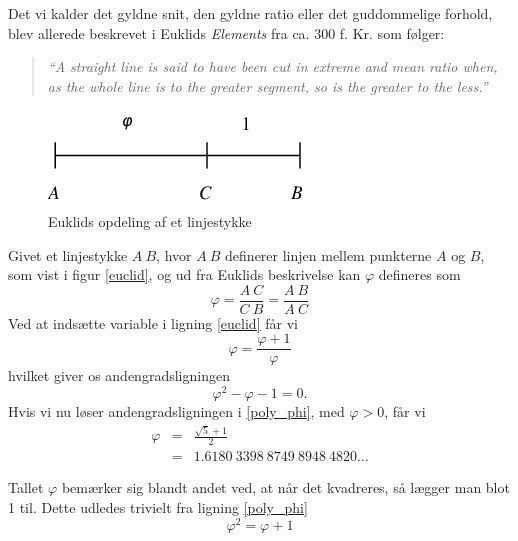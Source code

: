 {
Det vi kalder det gyldne snit, den gyldne ratio eller det guddommelige
forhold, blev allerede beskrevet i Euklids \emph{Elements} fra ca. 300
f.  Kr. som følger:
\begin{quote}
	\emph{``A straight line is said to have been cut in extreme
	and mean ratio when, as the whole line is to the greater
	segment, so is the greater to the less.''}\cite{Euclid300bc}
\end{quote}

\begin{figure}[h!]
	\begin{center}
		\includegraphics[scale=0.49,angle=0]{afsnit/baggrund/billeder/line_segment_a_c_b}
	\end{center}
	\caption{Euklids opdeling af et linjestykke}
	\label{line_segment}
\end{figure}

Givet et linjestykke $A\ B$, hvor $A\ B$ definerer linjen mellem
punkterne $A$ og $B$, som vist i figur \ref{euclid}, og ud fra Euklids
beskrivelse kan $\varphi$ defineres som
\begin{equation}
	\varphi	= \frac{A\ C}{C\ B} = \frac{A\ B}{A\ C}
	\label{euclid}
\end{equation}
Ved at indsætte variable i ligning \ref{euclid} får vi
\begin{equation}
	\varphi = \frac{\varphi + 1}{\varphi}
	\label{expand_euclid}
\end{equation}
hvilket giver os andengradsligningen
\begin{equation}
	\varphi^{2} - \varphi - 1 = 0.
	\label{poly_phi}
\end{equation}
Hvis vi nu løser andengradsligningen i \ref{poly_phi}, med
$\varphi > 0$, får vi
\begin{eqnarray*}
	\varphi	& =	& \frac{\sqrt{5} + 1}{2} \\
		& =	& 1.6180\ 3398\ 8749\ 8948\ 4820 \dots
\end{eqnarray*}

Tallet $\varphi$ bemærker sig blandt andet ved, at når det kvadreres, så
lægger man blot 1 til. Dette udledes trivielt fra ligning \ref{poly_phi}
\begin{equation}
	\varphi^{2} = \varphi + 1
	\label{phi_squared}
\end{equation}

}
